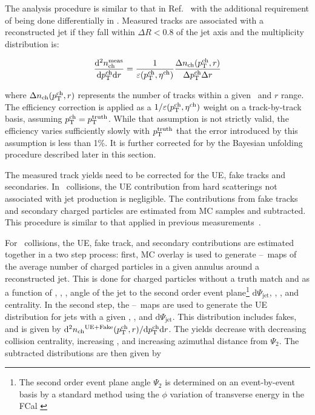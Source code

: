 
The analysis procedure is similar to that in Ref.~\cite{Aaboud:2018hpb} with the additional requirement of being done differentially in \rvar. Measured tracks are associated with a reconstructed jet if they fall within $\Delta R < 0.8$ of the jet axis and the multiplicity distribution is:

\begin{align*}
\dfrac{\mathrm{d}^{2} \mbox{$n_{\mathrm{ch}}^{\mathrm{meas}}$} }{ \mathrm{d} \mbox{$p_{\mathrm{T}}^{\mathrm{ch}}$} \mathrm{d} r} = \frac{1}{\varepsilon(\mbox{$p_{\mathrm{T}}^{\mathrm{ch}}$},\mbox{$\eta^{\mathrm{ch}}$})} \frac{\Delta \mbox{$n_{\mathrm{ch}}$}( \mbox{$p_{\mathrm{T}}^{\mathrm{ch}}$}, r)}{ \Delta\mbox{$p_{\mathrm{T}}^{\mathrm{ch}}$} \Delta r}
\end{align*}

where $\Delta \mbox{$n_{\mathrm{ch}}$} (\mbox{$p_{\mathrm{T}}^{\mathrm{ch}}$}, r)$ represents the number of tracks within a given \pttrk\ and $r$ range. The efficiency correction is applied as a $1/\varepsilon(\mbox{$p_{\mathrm{T}}^{\mathrm{ch}}$},\mbox{$\eta^{\mathrm{ch}}$})$ weight on a track-by-track basis, assuming $\mbox{$p_{\mathrm{T}}^{\mathrm{ch}}$} = \mbox{$p_{\mathrm{T}}^{\mathrm{truth}}$}$. While that assumption is not strictly valid, the efficiency varies sufficiently slowly with $\mbox{$p_{\mathrm{T}}^{\mathrm{truth}}$}$ that the error
introduced by this assumption is less than 1\%. It is further corrected for by the Bayesian unfolding procedure described later in this section.

The measured track yields need to be corrected for the UE, fake tracks and secondaries. In \pp\ collisions, the UE contribution from hard scatterings not associated with jet production is negligible. The contributions from fake tracks and secondary charged particles are estimated from MC samples and subtracted. This procedure is similar to that applied in previous measurements~\cite{Aaboud:2017tke,Aaboud:2018hpb}.

For \pbpb\ collisions, the UE, fake track, and secondary contributions are estimated together in a two step process: first, MC overlay is used to generate \etajet--\phijet\ maps of the average number of charged particles in a given annulus around a reconstructed jet. This is done for charged particles without a truth match and as a function of \ptjet, \etajet, \phijet, angle of the jet to the second order event plane\footnote{The second order event plane angle $\Psi_2$ is determined on an event-by-event basis by a standard method using the $\phi$ variation of transverse energy in the FCal \cite{ATLAS:2012at}} $ \mathrm{d}\Psi_{\mathrm{jet}}$, \rvar, \pttrk, and centrality. In the second step, the \etajet--\phijet\ maps are used to generate the UE distribution for jets with a given \etajet, \phijet, and $\mathrm{d}\Psi_{\mathrm{jet}}$. This distribution includes fakes, and is given by \mbox{$\mathrm{d}^2 \mbox{$n_{\mathrm{ch}}$}^{\mathrm{UE+Fake}}(\mbox{$p_{\mathrm{T}}^{\mathrm{ch}}$}, r) / \mathrm{d} \mbox{$p_{\mathrm{T}}^{\mathrm{ch}}$} \mathrm{d} r$}. The yields decrease with decreasing collision centrality, increasing \pttrk, and increasing azimuthal distance from $\Psi_2$. The subtracted distributions are then given by 

